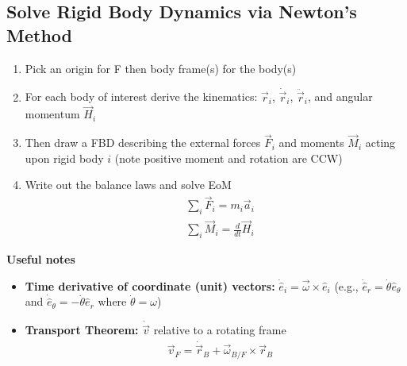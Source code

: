 \documentclass[conference]{IEEEtran}
\begin{document}
\subsection{Solve Rigid Body Dynamics via Newton's Method}
\begin{enumerate}
    \item Pick an origin for F then body frame(s) for the body(s)
    \item For each body of interest derive the kinematics: $\vec{r}_i$, $\dot{\vec{r}}_i$, $\ddot{\vec{r}}_i$, and angular momentum $\vec{H}_i$
    \item Then draw a FBD describing the external forces $\vec{F}_i$ and moments $\vec{M}_i$ acting upon rigid body $i$ (note positive moment and rotation are CCW)
    \item Write out the balance laws and solve EoM 
    \begin{align}
        & \sum_i \vec{F}_i = m_i \vec{a}_i \\
        & \sum_i \vec{M}_i = \frac{d}{dt}\vec{H}_i
    \end{align} 
\end{enumerate}

\textbf{Useful notes} 
\begin{itemize}
    \item \textbf{Time derivative of coordinate (unit) vectors:} $\dot{\hat{e}}_i = \vec{\omega} \times \hat{e}_i$ (e.g., $\dot{\hat{e}}_r = \dot{\theta}\hat{e}_\theta$ and $\dot{\hat{e}}_\theta = -\dot{\theta}\hat{e}_r$ where $\dot{\theta} = \omega$)
    \item \textbf{Transport Theorem:} $\dot{\vec{v}}$ relative to a rotating frame
    \begin{align}
        & \vec{v}_F = \dot{\vec{r}}_B + \vec{\omega}_{B/F} \times \vec{r}_B
    \end{align}
\end{itemize}
\end{document}
